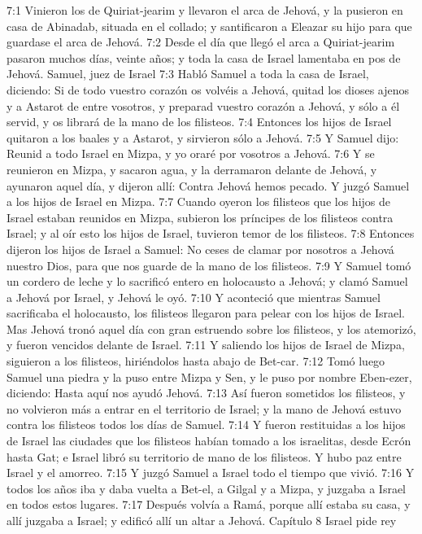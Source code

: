 7:1 Vinieron los de Quiriat-jearim y llevaron el arca de Jehová, y la pusieron en casa de Abinadab, situada en el collado; y santificaron a Eleazar su hijo para que guardase el arca de Jehová. 
7:2 Desde el día que llegó el arca a Quiriat-jearim pasaron muchos días, veinte años; y toda la casa de Israel lamentaba en pos de Jehová.  
Samuel, juez de Israel 
7:3 Habló Samuel a toda la casa de Israel, diciendo: Si de todo vuestro corazón os volvéis a Jehová, quitad los dioses ajenos y a Astarot de entre vosotros, y preparad vuestro corazón a Jehová, y sólo a él servid, y os librará de la mano de los filisteos.  
7:4 Entonces los hijos de Israel quitaron a los baales y a Astarot, y sirvieron sólo a Jehová.  
7:5 Y Samuel dijo: Reunid a todo Israel en Mizpa, y yo oraré por vosotros a Jehová.  
7:6 Y se reunieron en Mizpa, y sacaron agua, y la derramaron delante de Jehová, y ayunaron aquel día, y dijeron allí: Contra Jehová hemos pecado. Y juzgó Samuel a los hijos de Israel en Mizpa.  
7:7 Cuando oyeron los filisteos que los hijos de Israel estaban reunidos en Mizpa, subieron los príncipes de los filisteos contra Israel; y al oír esto los hijos de Israel, tuvieron temor de los filisteos.  
7:8 Entonces dijeron los hijos de Israel a Samuel: No ceses de clamar por nosotros a Jehová nuestro Dios, para que nos guarde de la mano de los filisteos.  
7:9 Y Samuel tomó un cordero de leche y lo sacrificó entero en holocausto a Jehová; y clamó Samuel a Jehová por Israel, y Jehová le oyó.  
7:10 Y aconteció que mientras Samuel sacrificaba el holocausto, los filisteos llegaron para pelear con los hijos de Israel. Mas Jehová tronó aquel día con gran estruendo sobre los filisteos, y los atemorizó, y fueron vencidos delante de Israel.  
7:11 Y saliendo los hijos de Israel de Mizpa, siguieron a los filisteos, hiriéndolos hasta abajo de Bet-car.  
7:12 Tomó luego Samuel una piedra y la puso entre Mizpa y Sen, y le puso por nombre Eben-ezer, diciendo: Hasta aquí nos ayudó Jehová. 
7:13 Así fueron sometidos los filisteos, y no volvieron más a entrar en el territorio de Israel; y la mano de Jehová estuvo contra los filisteos todos los días de Samuel.  
7:14 Y fueron restituidas a los hijos de Israel las ciudades que los filisteos habían tomado a los israelitas, desde Ecrón hasta Gat; e Israel libró su territorio de mano de los filisteos. Y hubo paz entre Israel y el amorreo.  
7:15 Y juzgó Samuel a Israel todo el tiempo que vivió.  
7:16 Y todos los años iba y daba vuelta a Bet-el, a Gilgal y a Mizpa, y juzgaba a Israel en todos estos lugares.  
7:17 Después volvía a Ramá, porque allí estaba su casa, y allí juzgaba a Israel; y edificó allí un altar a Jehová.  
Capítulo 8
Israel pide rey  

